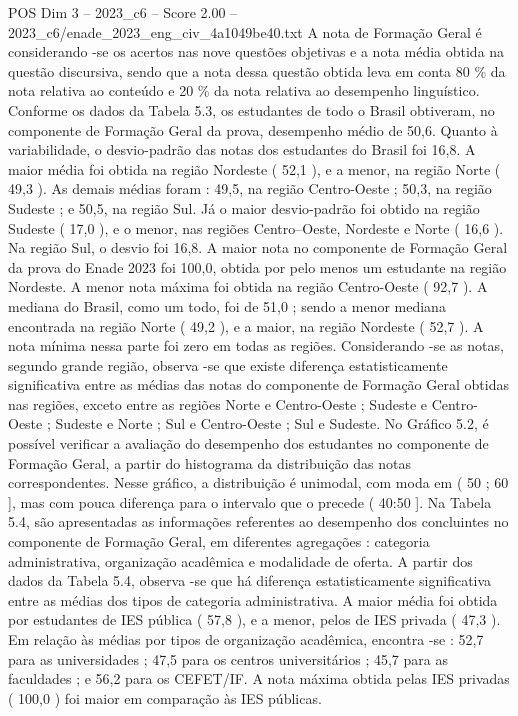 \begin{textsample}{POS Dim 3 – 2023\_c6 – Score 2.00 – 2023\_c6/enade\_2023\_eng\_civ\_4a1049be40.txt}
A nota de Formação Geral é considerando -se os acertos nas nove questões objetivas e a nota média obtida na questão discursiva, sendo que a nota dessa questão obtida leva em conta 80 \% da nota relativa ao conteúdo e 20 \% da nota relativa ao desempenho linguístico.
Conforme os dados da Tabela 5.3, os estudantes de todo o Brasil obtiveram, no componente de Formação Geral da prova, desempenho médio de 50,6.
Quanto à variabilidade, o desvio-padrão das notas dos estudantes do Brasil foi 16,8.
A maior média foi obtida na região Nordeste ( 52,1 ), e a menor, na região Norte ( 49,3 ).
As demais médias foram : 49,5, na região Centro-Oeste ; 50,3, na região Sudeste ; e 50,5, na região Sul.
Já o maior desvio-padrão foi obtido na região Sudeste ( 17,0 ), e o menor, nas regiões Centro--Oeste, Nordeste e Norte ( 16,6 ).
Na região Sul, o desvio foi 16,8.
A maior nota no componente de Formação Geral da prova do Enade 2023 foi 100,0, obtida por pelo menos um estudante na região Nordeste.
A menor nota máxima foi obtida na região Centro-Oeste ( 92,7 ).
A mediana do Brasil, como um todo, foi de 51,0 ; sendo a menor mediana encontrada na região Norte ( 49,2 ), e a maior, na região Nordeste ( 52,7 ).
A nota mínima nessa parte foi zero em todas as regiões.
Considerando -se as notas, segundo grande região, observa -se que existe diferença estatisticamente significativa entre as médias das notas do componente de Formação Geral obtidas nas regiões, exceto entre as regiões Norte e Centro-Oeste ; Sudeste e Centro-Oeste ; Sudeste e Norte ; Sul e Centro-Oeste ; Sul e Sudeste.
No Gráfico 5.2, é possível verificar a avaliação do desempenho dos estudantes no componente de Formação Geral, a partir do histograma da distribuição das notas correspondentes.
Nesse gráfico, a distribuição é unimodal, com moda em ( 50 ; 60 ], mas com pouca diferença para o intervalo que o precede ( 40:50 ].
Na Tabela 5.4, são apresentadas as informações referentes ao desempenho dos concluintes no componente de Formação Geral, em diferentes agregações : categoria administrativa, organização acadêmica e modalidade de oferta.
A partir dos dados da Tabela 5.4, observa -se que há diferença estatisticamente significativa entre as médias dos tipos de categoria administrativa.
A maior média foi obtida por estudantes de IES pública ( 57,8 ), e a menor, pelos de IES privada ( 47,3 ).
Em relação às médias por tipos de organização acadêmica, encontra -se : 52,7 para as universidades ; 47,5 para os centros universitários ; 45,7 para as faculdades ; e 56,2 para os CEFET/IF.
A nota máxima obtida pelas IES privadas ( 100,0 ) foi maior em comparação às IES públicas.

\end{textsample}
